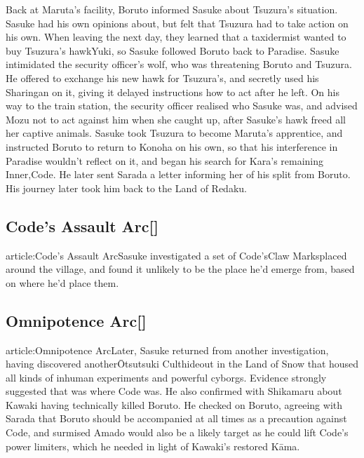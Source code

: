 \documentclass[a4paper,12pt]{article}
\begin{document}
Back at Maruta's facility, Boruto informed Sasuke about Tsuzura's situation. Sasuke had his own opinions about, but felt that Tsuzura had to take action on his own. When leaving the next day, they learned that a taxidermist wanted to buy Tsuzura's hawkYuki, so Sasuke followed Boruto back to Paradise. Sasuke intimidated the security officer's wolf, who was threatening Boruto and Tsuzura. He offered to exchange his new hawk for Tsuzura's, and secretly used his Sharingan on it, giving it delayed instructions how to act after he left. On his way to the train station, the security officer realised who Sasuke was, and advised Mozu not to act against him when she caught up, after Sasuke's hawk freed all her captive animals. Sasuke took Tsuzura to become Maruta's apprentice, and instructed Boruto to return to Konoha on his own, so that his interference in Paradise wouldn't reflect on it, and began his search for Kara's remaining Inner,Code. He later sent Sarada a letter informing her of his split from Boruto. His journey later took him back to the Land of Redaku.\\ \par \vspace{0.5cm}

\subsection*{Code's Assault Arc[]}\n\nMain article:Code's Assault ArcSasuke investigated a set of Code'sClaw Marksplaced around the village, and found it unlikely to be the place he'd emerge from, based on where he'd place them.\\ \par \vspace{0.5cm}

\subsection*{Omnipotence Arc[]}\n\nMain article:Omnipotence ArcLater, Sasuke returned from another investigation, having discovered anotherŌtsutsuki Culthideout in the Land of Snow that housed all kinds of inhuman experiments and powerful cyborgs. Evidence strongly suggested that was where Code was. He also confirmed with Shikamaru about Kawaki having technically killed Boruto. He checked on Boruto, agreeing with Sarada that Boruto should be accompanied at all times as a precaution against Code, and surmised Amado would also be a likely target as he could lift Code's power limiters, which he needed in light of Kawaki's restored Kāma.\\ \par \vspace{0.5cm}
\end{document}
